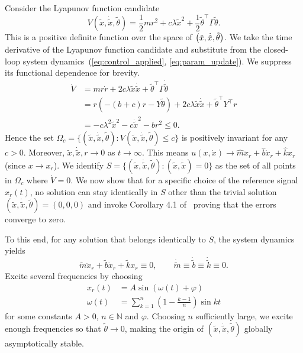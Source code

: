 Consider the Lyapunov function candidate
%
\begin{equation*}
    V(\tilde{x}, \dot{\tilde{x}}, \tilde{\theta}) = \frac{1}{2}mr^2 + 
    c\lambda\tilde{x}^2 + \frac{1}{2}\tilde{\theta}^\top\Gamma\tilde{\theta}.
\end{equation*}
%
This is a positive definite function over the space of $\begin{pmatrix}\tilde{x},
\dot{\tilde{x}}, \tilde{\theta}\end{pmatrix}$. We take the time derivative of the Lyapunov
function candidate and substitute from the closed-loop system
dynamics~(\ref{eq:control_applied}, \ref{eq:param_update}). We suppress its
functional dependence for brevity.
%
\begin{align*}
    \dot{V} &= mr\dot{r} + 2c\lambda \tilde{x}\dot{\tilde{x}} +
    \tilde{\theta}^\top\Gamma\dot{\tilde{\theta}} \\
            &= r\left(-(b+c)r - Y\tilde{\theta}\right) + 2c\lambda
            \tilde{x}\dot{\tilde{x}} + \tilde{\theta}^\top Y^\top r \\
            &= -c\lambda^2\tilde{x}^2 - c\dot{\tilde{x}}^2 - br^2 \leq 0.
\end{align*}
%
Hence the set $\Omega_c = \{(\tilde{x}, \dot{\tilde{x}}, \tilde{\theta}):
V(\tilde{x}, \dot{\tilde{x}}, \tilde{\theta}) \leq c \}$ is positively
invariant for any $c > 0$. Moreover, $\tilde{x}, \dot{\tilde{x}}, r \rightarrow
0$ as $t \rightarrow \infty$. This means $u(x, \dot{x}) \rightarrow
\hat{m}\ddot{x}_r + \hat{b}\dot{x}_r + \hat{k}x_r$ (since $x \rightarrow x_r$).
We identify $S = \{(\tilde{x}, \dot{\tilde{x}}, \tilde{\theta}): (\tilde{x},
\dot{\tilde{x}}) = 0\}$ as the set of all points in $\Omega_c$ where $\dot{V} =
0$. We now show that for a specific choice of the reference signal $x_r(t)$, no
solution can stay identically in $S$ other than the trivial solution
$(\tilde{x}, \dot{\tilde{x}}, \tilde{\theta}) = (0,0,0)$ and invoke Corollary
4.1 of~\cite{khalil2015nonlinear} proving that the errors converge to zero.

To this end, for any solution that belongs identically to $S$, the system
dynamics yields \[ \tilde{m}\ddot{x}_r + \tilde{b}\dot{x}_r + \tilde{k}x_r
\equiv 0, \qquad \dot{\tilde{m}} \equiv \dot{\tilde{b}} \equiv \dot{\tilde{k}}
\equiv 0. \] 
%
Excite several frequencies by choosing 
\begin{align*}
    x_r(t) &= A\sin{\left(\omega(t) + \varphi\right)} \\
    \omega(t) &= \sum_{k=1}^n \left(1-\frac{k-1}{n}\right)\sin{k t}
\end{align*}
%
for some constants $A > 0$, $n \in \mathbb{N}$ and $\varphi$. Choosing $n$
sufficiently large, we excite enough frequencies so that $\tilde{\theta}
\rightarrow 0$, making the origin of $(\tilde{x}, \dot{\tilde{x}},
\tilde{\theta})$ globally asymptotically stable.
